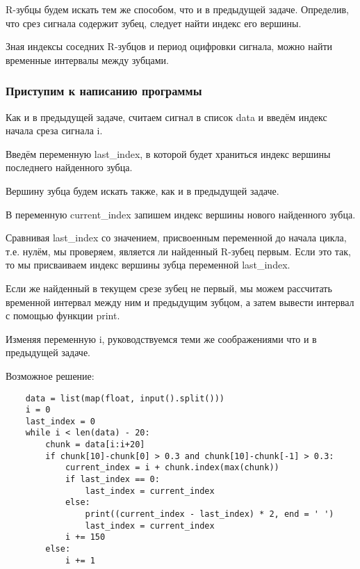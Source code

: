 \solutionSection

R-зубцы будем искать тем же способом, что и в предыдущей задаче. Определив, что срез сигнала содержит зубец, следует найти индекс его вершины.

Зная индексы соседних R-зубцов и период оцифровки сигнала, можно найти временные интервалы между зубцами.


\subsubsection*{Приступим к написанию программы}

Как и в предыдущей задаче, считаем сигнал в список data и введём индекс начала среза сигнала i.

Введём переменную last\_index, в которой будет храниться индекс вершины последнего найденного зубца.

Вершину зубца будем искать также, как и в предыдущей задаче.

В переменную current\_index запишем индекс вершины нового найденного зубца.

Сравнивая last\_index со значением, присвоенным переменной до начала цикла, т.е. нулём, мы проверяем, является ли найденный R-зубец первым. Если это так, то мы присваиваем индекс вершины зубца переменной last\_index.

Если же найденный в текущем срезе зубец не первый, мы можем рассчитать временной интервал между ним и предыдущим зубцом, а затем вывести интервал с помощью функции print.

Изменяя переменную i, руководствуемся теми же соображениями что и в предыдущей задаче.

Возможное решение:

\begin{verbatim}
    data = list(map(float, input().split()))
    i = 0                    
    last_index = 0
    while i < len(data) - 20:
        chunk = data[i:i+20]
        if chunk[10]-chunk[0] > 0.3 and chunk[10]-chunk[-1] > 0.3:
            current_index = i + chunk.index(max(chunk)) 
            if last_index == 0:
                last_index = current_index
            else:
                print((current_index - last_index) * 2, end = ' ')
                last_index = current_index
            i += 150
        else:
            i += 1

\end{verbatim}
